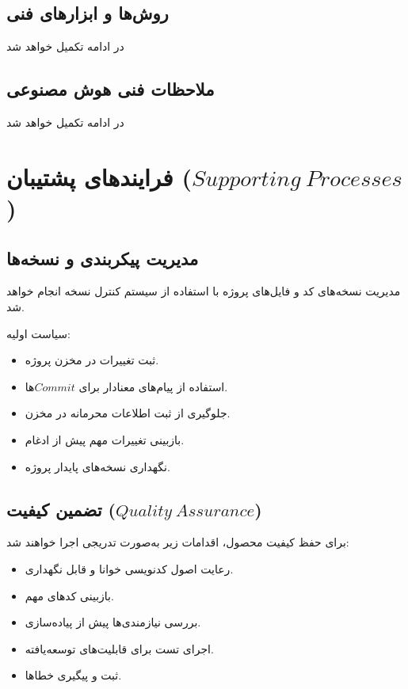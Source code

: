 \documentclass[12pt,a4paper]{article}
\begin{document}
	\subsection{روش‌ها و ابزارهای فنی}
	
	در ادامه تکمیل خواهد شد
	
	\subsection{ملاحظات فنی هوش مصنوعی}
	
	در ادامه تکمیل خواهد شد
	
	\section{فرایندهای پشتیبان ($Supporting\ Processes$)}
	
	\subsection{مدیریت پیکربندی و نسخه‌ها}
	
	مدیریت نسخه‌های کد و فایل‌های پروژه
	با استفاده از سیستم کنترل نسخه انجام خواهد شد.
	
	سیاست اولیه:
	
	\begin{itemize}
		\item ثبت تغییرات در مخزن پروژه.
		\item استفاده از پیام‌های معنادار برای $Commit$ها.
		\item جلوگیری از ثبت اطلاعات محرمانه در مخزن.
		\item بازبینی تغییرات مهم پیش از ادغام.
		\item نگهداری نسخه‌های پایدار پروژه.
	\end{itemize}
	
	\subsection{تضمین کیفیت ($Quality\ Assurance$)}
	
	برای حفظ کیفیت محصول، اقدامات زیر
	به‌صورت تدریجی اجرا خواهند شد:
	
	\begin{itemize}
		\item رعایت اصول کدنویسی خوانا و قابل نگهداری.
		\item بازبینی کدهای مهم.
		\item بررسی نیازمندی‌ها پیش از پیاده‌سازی.
		\item اجرای تست برای قابلیت‌های توسعه‌یافته.
		\item ثبت و پیگیری خطاها.
	\end{itemize}
	
\end{document}
